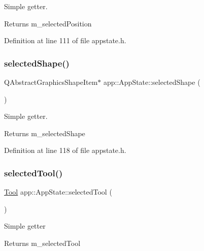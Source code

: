 Simple getter. \begin{DoxyReturn}{Returns}
m\+\_\+selected\+Position 
\end{DoxyReturn}


Definition at line 111 of file appstate.\+h.

\mbox{\label{classapp_1_1_app_state_aef0851d3a3c35bb860e43f5dc682d9a7}} 
\subsubsection{\texorpdfstring{selected\+Shape()}{selectedShape()}}
{\footnotesize\ttfamily Q\+Abstract\+Graphics\+Shape\+Item$\ast$ app\+::\+App\+State\+::selected\+Shape (\begin{DoxyParamCaption}{ }\end{DoxyParamCaption})\hspace{0.3cm}{\ttfamily [inline]}}

Simple getter. \begin{DoxyReturn}{Returns}
m\+\_\+selected\+Shape 
\end{DoxyReturn}


Definition at line 118 of file appstate.\+h.

\mbox{\label{classapp_1_1_app_state_adcdc7d3fa11e8aecd45baf4f4eb75ef7}} 
\subsubsection{\texorpdfstring{selected\+Tool()}{selectedTool()}}
{\footnotesize\ttfamily \mbox{\hyperlink{classapp_1_1_app_state_aa641298e5827611da2512591c4a0e966}{Tool}} app\+::\+App\+State\+::selected\+Tool (\begin{DoxyParamCaption}{ }\end{DoxyParamCaption})\hspace{0.3cm}{\ttfamily [inline]}}

Simple getter \begin{DoxyReturn}{Returns}
m\+\_\+selected\+Tool 
\end{DoxyReturn}


